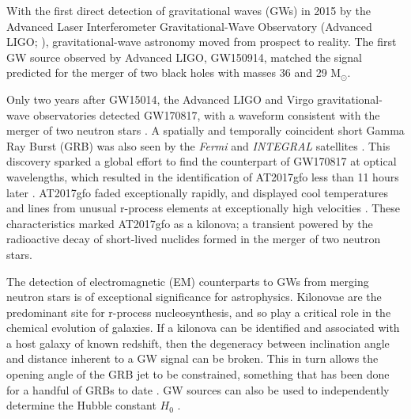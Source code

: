 \documentclass{aa}
\begin{document}
With the first direct detection of gravitational waves (GWs) in 2015 by the Advanced Laser Interferometer Gravitational-Wave
Observatory (Advanced LIGO; \citealp{FirstGW}), gravitational-wave astronomy moved from prospect to reality. The first GW source observed by Advanced LIGO, GW150914, matched the signal predicted for the merger of two black holes with masses 36 and 29 M$_{\odot}$.

Only two years after GW15014, %
the Advanced LIGO and Virgo gravitational-wave observatories detected GW170817, with a waveform consistent with the merger of two neutron stars \citep{GW170817}. A spatially and temporally coincident short Gamma Ray Burst (GRB) was also seen by the {\it Fermi} and {\it INTEGRAL} satellites \citep{GW170817_GRB}. This discovery sparked a global effort to find the counterpart of GW170817 at optical wavelengths, which resulted in the identification of AT2017gfo less than 11 hours later \citep{GW170817_EM}. AT2017gfo faded exceptionally rapidly, and displayed cool temperatures and lines from unusual r-process elements at exceptionally high velocities \citep{Smar17,Arca17,Pian17,Coul17,Kilp17}. These characteristics marked AT2017gfo as a kilonova; a transient powered by the radioactive decay of short-lived nuclides formed in the merger of two neutron stars.

The detection of electromagnetic (EM) counterparts to GWs from merging neutron stars is of exceptional significance for astrophysics. Kilonovae are the predominant site for r-process nucleosynthesis, and so play a critical role in the chemical evolution of galaxies. If a kilonova can be identified and associated with a host galaxy of known redshift, then the degeneracy between inclination angle and distance inherent to a GW signal can be broken. This in turn allows the opening angle of the GRB jet to be constrained, something that has been done for a handful of GRBs to date \citep{2018ApJ...857..128J}. GW %
sources can also be used to independently determine the Hubble constant $H_0$ \citep{GWH0}.
\end{document}
